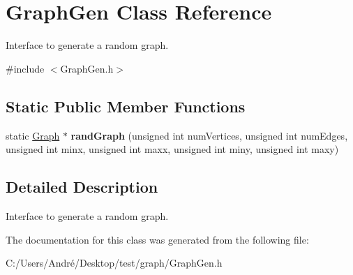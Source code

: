 \hypertarget{class_graph_gen}{}\section{Graph\+Gen Class Reference}
\label{class_graph_gen}


Interface to generate a random graph.  




{\ttfamily \#include $<$Graph\+Gen.\+h$>$}

\subsection*{Static Public Member Functions}
\begin{DoxyCompactItemize}
\item 
\hypertarget{class_graph_gen_a62e8bdf0456f2a50369a440d62c73f7d}{}static \hyperlink{class_graph}{Graph} $\ast$ {\bfseries rand\+Graph} (unsigned int num\+Vertices, unsigned int num\+Edges, unsigned int minx, unsigned int maxx, unsigned int miny, unsigned int maxy)\label{class_graph_gen_a62e8bdf0456f2a50369a440d62c73f7d}

\end{DoxyCompactItemize}


\subsection{Detailed Description}
Interface to generate a random graph. 

The documentation for this class was generated from the following file\+:\begin{DoxyCompactItemize}
\item 
C\+:/\+Users/\+André/\+Desktop/test/graph/Graph\+Gen.\+h\end{DoxyCompactItemize}
